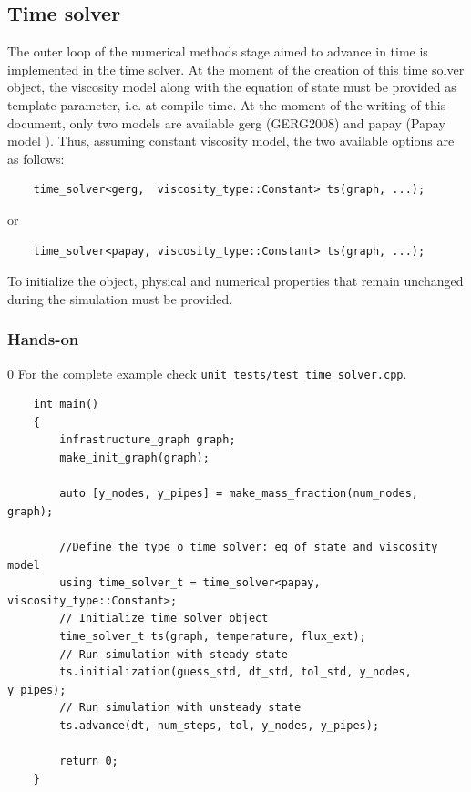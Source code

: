 \subsection{Time solver}

The outer loop of the numerical methods stage aimed to advance in time is implemented in the time solver.
At the moment of the creation of this time solver object, the viscosity model along with the equation of state  must be provided as template parameter, i.e. at compile time. At the moment of the writing of this document, only two models are available gerg (GERG2008) and papay (Papay model \cite{}). Thus, assuming constant viscosity model, the two  available options are as follows:
\begin{verbatim}
    time_solver<gerg,  viscosity_type::Constant> ts(graph, ...);   
\end{verbatim}
or
\begin{verbatim}
    time_solver<papay, viscosity_type::Constant> ts(graph, ...);   
\end{verbatim}

To initialize the object, physical and numerical properties that remain unchanged during the simulation must be provided.
\subsubsection{Hands-on}0
For the complete example check \texttt{unit\_tests/test\_time\_solver.cpp}.    
\begin{verbatim}
    int main()
    {
        infrastructure_graph graph;
        make_init_graph(graph);
        
        auto [y_nodes, y_pipes] = make_mass_fraction(num_nodes, graph);

        //Define the type o time solver: eq of state and viscosity model
        using time_solver_t = time_solver<papay, viscosity_type::Constant>; 
        // Initialize time solver object
        time_solver_t ts(graph, temperature, flux_ext);
        // Run simulation with steady state
        ts.initialization(guess_std, dt_std, tol_std, y_nodes, y_pipes); 
        // Run simulation with unsteady state
        ts.advance(dt, num_steps, tol, y_nodes, y_pipes);
     
        return 0;
    }
\end{verbatim}
    

